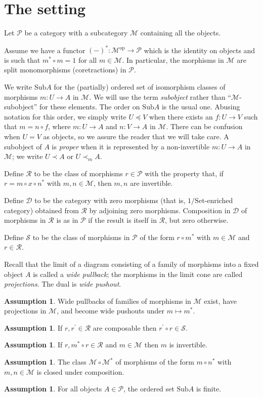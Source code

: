 \documentclass[a4paper,12pt,reqno]{amsart}
\theoremstyle{definition}
\newtheorem{assumption}[theorem]{Assumption}
\theoremstyle{fact}
\theoremstyle{genquest}
\theoremstyle{step}
\newcommand{\dd}{\colon}
\newcommand{\ra}{\rightarrow}
\def\CD{{\mathscr D}}
\def\CM{{\mathscr M}}
\def\CP{{\mathscr P}}
\def\CR{{\mathscr R}}
\def\CS{{\mathscr S}}
\begin{document}
\section{The setting}\label{setting}

Let $\CP$ be a category with a subcategory $\CM$ containing all the objects.

Assume we have a functor $(-)^*\dd \CM^{\mathrm{op}} \ra \CP$
which is the identity on objects and is 
such that $m^*\circ m=1$ for all $m\in \CM$.
In particular, the morphisms in $\CM$ are split monomorphisms (coretractions)
in $\CP$. 

We write $\mathrm{Sub}A$ for the (partially) ordered set of isomorphism 
classes of morphisms
$m:U\ra A$ in $\CM$. We will use the term {\em subobject} 
rather than ``$\CM$-subobject'' for these elements. 
The order on $\mathrm{Sub}A$ is the usual one. 
Abusing notation for this order, we simply write $U\preceq V$ when there 
exists an $f : U\ra V$ such that $m=n\circ f$, where $m:U\ra A$ and $n:V\ra A$ in $\CM$. 
There can be confusion when $U=V$ as objects, so we assure the reader that we will take care.
A subobject of $A$ is {\em proper} when it is represented by a non-invertible $m:U\ra A$
in $\CM$; we write $U\prec A$ or $U\prec_m A$. 

Define $\CR$ to be the class of morphisms $r\in \CP$ with the property that, if $r = m\circ x \circ n^*$ with $m, n \in \CM$, then $m, n$ are invertible. 

Define $\CD$ to be the category with zero morphisms (that is, $1/\mathrm{Set}$-enriched
category) obtained from $\CR$ by adjoining zero morphisms.
Composition in $\CD$ of morphisms in $\CR$ is as in $\CP$ if the result is itself
in $\CR$, but zero otherwise. 

Define $\CS$ to be the class of morphisms in $\CP$ of the form $r\circ m^*$ with
$m\in \CM$ and $r\in \CR$. 

Recall that the limit of a diagram consisting of a family of morphisms into
a fixed object $A$ is called a {\em wide pullback}; the morphisms in the
limit cone are called {\em projections}. 
The dual is {\em wide pushout}.  

\begin{assumption}\label{ass1}
Wide pullbacks of families of morphisms in $\CM$ exist, have projections in $\CM$, and become wide pushouts under $m \mapsto m^*$.
\end{assumption}
\begin{assumption}\label{ass2}
If $r, r^{\prime}\in \CR$ are composable then $r^{\prime}\circ r \in \CS$. 
\end{assumption}
\begin{assumption}\label{ass3}
If $r,m^*\circ r \in \CR$ and $m\in \CM$ then $m$ is invertible.
\end{assumption}
\begin{assumption}\label{ass4}
The class $\CM \circ \CM^*$ of morphisms of the form $m\circ n^*$ with $m,n\in \CM$ is closed under composition.
\end{assumption}
\begin{assumption}\label{ass5}
For all objects $A\in \CP$, the ordered set $\mathrm{Sub}A$ is finite. 
\end{assumption}
\end{document}
